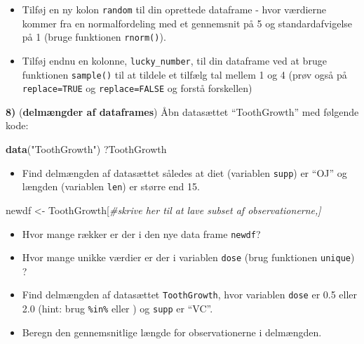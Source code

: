 \documentclass[
]{book}
\newenvironment{Shaded}{\begin{snugshade}}{\end{snugshade}}
\newcommand{\CommentTok}[1]{\textcolor[rgb]{0.56,0.35,0.01}{\textit{#1}}}
\newcommand{\FunctionTok}[1]{\textcolor[rgb]{0.13,0.29,0.53}{\textbf{#1}}}
\newcommand{\NormalTok}[1]{#1}
\newcommand{\OtherTok}[1]{\textcolor[rgb]{0.56,0.35,0.01}{#1}}
\newcommand{\SpecialCharTok}[1]{\textcolor[rgb]{0.81,0.36,0.00}{\textbf{#1}}}
\newcommand{\StringTok}[1]{\textcolor[rgb]{0.31,0.60,0.02}{#1}}
\providecommand{\tightlist}{%
  \setlength{\itemsep}{0pt}\setlength{\parskip}{0pt}}
\theoremstyle{definition}
\theoremstyle{definition}
\theoremstyle{definition}
\theoremstyle{definition}
\theoremstyle{remark}
\begin{document}
\begin{itemize}
\tightlist
\item
  Tilføj en ny kolon \texttt{random} til din oprettede dataframe - hvor værdierne kommer fra en normalfordeling med et gennemsnit på 5 og standardafvigelse på 1 (bruge funktionen \texttt{rnorm()}).
\end{itemize}

\begin{Shaded}
\end{Shaded}

\begin{itemize}
\tightlist
\item
  Tilføj endnu en kolonne, \texttt{lucky\_number}, til din dataframe ved at bruge funktionen \texttt{sample()} til at tildele et tilfælg tal mellem 1 og 4 (prøv også på \texttt{replace=TRUE} og \texttt{replace=FALSE} og forstå forskellen)
\end{itemize}

\textbf{8)} (\textbf{delmængder af dataframes}) Åbn datasættet ``ToothGrowth'' med følgende kode:

\begin{Shaded}
\begin{Highlighting}[]
\FunctionTok{data}\NormalTok{(}\StringTok{"ToothGrowth"}\NormalTok{)}
\NormalTok{?ToothGrowth}
\end{Highlighting}
\end{Shaded}

\begin{itemize}
\tightlist
\item
  Find delmængden af datasættet således at diet (variablen \texttt{supp}) er ``OJ'' og længden (variablen \texttt{len}) er større end 15.
\end{itemize}

\begin{Shaded}
\begin{Highlighting}[]
\NormalTok{newdf }\OtherTok{\textless{}{-}}\NormalTok{ ToothGrowth[}\CommentTok{\#skrive her til at lave subset af observationerne,]}
\end{Highlighting}
\end{Shaded}

\begin{itemize}
\tightlist
\item
  Hvor mange rækker er der i den nye data frame \texttt{newdf}?
\item
  Hvor mange unikke værdier er der i variablen \texttt{dose} (brug funktionen \texttt{unique}) ?
\item
  Find delmængden af datasættet \texttt{ToothGrowth}, hvor variablen \texttt{dose} er 0.5 eller 2.0 (hint: brug \texttt{\%in\%} eller \texttt{\textbar{}}) og \texttt{supp} er ``VC''.
\item
  Beregn den gennemsnitlige længde for observationerne i delmængden.
\end{itemize}
\end{document}
